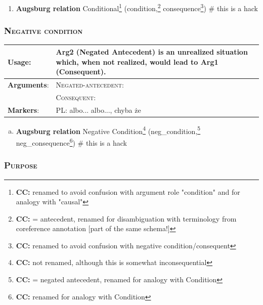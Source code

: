 \documentclass{udisc}
\newcommand{\noteCC}[1]{\footnote{{\textbf{CC:} {#1}}}}
\begin{document}
\begin{enumerate}
\item \textbf{Augsburg relation} Conditional\noteCC{renamed to avoid confusion with argument role "condition" and for analogy with "causal"} (condition,\noteCC{= antecedent, renamed for disambiguation with terminology from coreference annotation [part of the same schema!]} consequence\noteCC{renamed to avoid confusion with negative condition/consequent})
\nonstopmode # this is a hack
\end{enumerate}
\errorstopmode



\subsubsection{\textsc{Negative condition}}

\begin{tabularx}{\textwidth}{|l|L|}
\hline

\textbf{Usage}:           &  Arg2 (Negated Antecedent) is an unrealized situation which, when not realized, would lead
to Arg1 (Consequent).\\
\hline

\textbf{Arguments}:       &  \textsc{Negated-antecedent}:  \\
                          &  \textsc{Consequent}: \\
\hline

\textbf{Markers}:        &  PL: albo... albo..., chyba że \\
\hline

\end{tabularx}

\begin{enumerate}[a)]
\item \textbf{Augsburg relation} Negative Condition\noteCC{not renamed, although this is somewhat inconsequential} (neg\_condition,\noteCC{= negated antecedent, renamed for analogy with Condition} neg\_consequence\noteCC{renamed for analogy with Condition})
\nonstopmode # this is a hack
\end{enumerate}
\errorstopmode



\subsubsection{\textsc{Purpose}}
\end{document}
